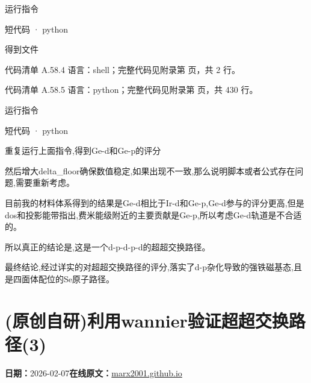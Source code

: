 \documentclass[lang=cn,scheme=chinese,color=blue,device=normal,toc=onecol,math=cm]{elegantbook}
\begin{document}
运行指令\par


\begin{inlinecodebox}{短代码 · python}
\end{inlinecodebox}


得到文件\par


\begin{codeindexbox}{代码清单 A.58.4}
语言：shell；完整代码见附录第 \pageref{code:58:4} 页，共 2 行。
\end{codeindexbox}


\begin{codeindexbox}{代码清单 A.58.5}
语言：python；完整代码见附录第 \pageref{code:58:5} 页，共 430 行。
\end{codeindexbox}


运行指令\par


\begin{inlinecodebox}{短代码 · python}
\end{inlinecodebox}


重复运行上面指令,得到Ge-d和Ge-p的评分\par


然后增大delta\_\allowbreak{}floor确保数值稳定,如果出现不一致,那么说明脚本或者公式存在问题,需要重新考虑。\par


目前我的材料体系得到的结果是Ge-d相比于Ir-d和Ge-p,Ge-d参与的评分更高,但是dos和投影能带指出,费米能级附近的主要贡献是Ge-p,所以考虑Ge-d轨道是不合适的。\par


所以真正的结论是,这是一个d-p-d-p-d的超超交换路径。\par


最终结论,经过详实的对超超交换路径的评分,落实了d-p杂化导致的强铁磁基态,且是四面体配位的Se原子路径。\par



\section{(原创自研)利用wannier验证超超交换路径(3)}
\begin{articlemeta}
\textbf{日期：}2026-02-07\hfill\textbf{在线原文：}\href{https://marx2001.github.io/sci-note\_posts/20260207-super3}{marx2001.github.io}
\end{articlemeta}
\end{document}

